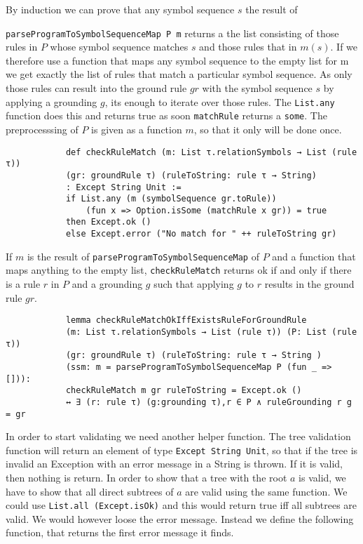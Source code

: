 \documentclass{article}
\begin{document}
        By induction we can prove that any symbol sequence $s$ the result of 
        
        \texttt{parseProgramToSymbolSequenceMap P m} returns a the list consisting of those rules in $P$ whose symbol sequence matches $s$ and those rules that in $m (s)$. If we therefore use a function that maps any symbol sequence to the empty list for m we get exactly the list of rules that match a particular symbol sequence. As only those rules can result into the ground rule $gr$ with the symbol sequence $s$ by applying a grounding $g$, its enough to iterate over those rules. The \texttt{List.any} function does this and returns true as soon \texttt{matchRule} returns a \texttt{some}. The preprocesssing of $P$ is given as a function $m$, so that it only will be done once.  
        
        \begin{lstlisting}
            def checkRuleMatch (m: List τ.relationSymbols → List (rule τ)) 
            (gr: groundRule τ) (ruleToString: rule τ → String)
            : Except String Unit :=
            if List.any (m (symbolSequence gr.toRule)) 
                (fun x => Option.isSome (matchRule x gr)) = true
            then Except.ok ()
            else Except.error ("No match for " ++ ruleToString gr)
        \end{lstlisting}

        If $m$ is the result of \texttt{parseProgramToSymbolSequenceMap} of $P$ and a function that maps anything to the empty list, \texttt{checkRuleMatch} returns ok if and only if there is a rule $r$ in $P$ and a grounding $g$ such that applying $g$ to $r$ results in the ground rule $gr$.

        \begin{lstlisting}
            lemma checkRuleMatchOkIffExistsRuleForGroundRule 
            (m: List τ.relationSymbols → List (rule τ)) (P: List (rule τ)) 
            (gr: groundRule τ) (ruleToString: rule τ → String ) 
            (ssm: m = parseProgramToSymbolSequenceMap P (fun _ => [])): 
            checkRuleMatch m gr ruleToString = Except.ok () 
            ↔ ∃ (r: rule τ) (g:grounding τ),r ∈ P ∧ ruleGrounding r g = gr
        \end{lstlisting}

        In order to start validating we need another helper function. The tree validation function will return an element of type \texttt{Except String Unit}, so that if the tree is invalid an Exception with an error message in a String is thrown. If it is valid, then nothing is return. In order to show that a tree with the root $a$ is valid, we have to show that all direct subtrees of $a$ are valid using the same function. We could use \texttt{List.all (Except.isOk)} and this would return true iff all subtrees are valid. We would however loose the error message. Instead we define the following function, that returns the first error message it finds.
\end{document}
